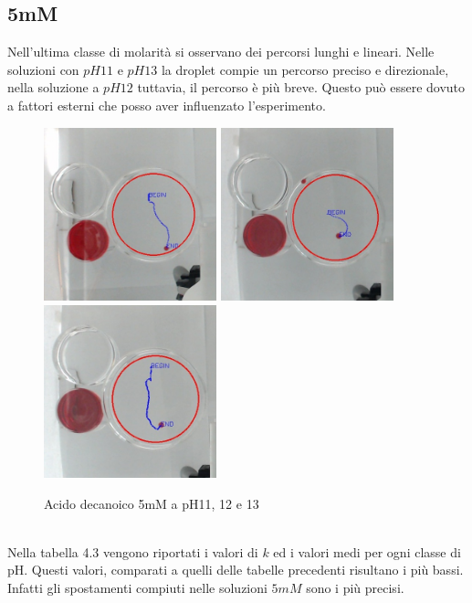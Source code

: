 \subsection{5mM}
Nell'ultima classe di molarità si osservano dei percorsi lunghi e lineari. Nelle soluzioni con $pH11$ e $pH13$ la droplet compie un percorso preciso e direzionale, nella soluzione a $pH12$ tuttavia, il percorso è più breve. Questo può essere dovuto a fattori esterni che posso aver influenzato l'esperimento.
\begin{figure}[h]
	\centering
   		{\includegraphics[width=5cm]{immagini/5mMpH11-1.jpg}} %
 	\hspace{2mm}   	
		{\includegraphics[width=5cm]{immagini/5mMpH11-2.jpg}}%
	\hspace{2mm}   	
		{\includegraphics[width=5cm]{immagini/5mMpH13-2.jpg}}%
	\caption{Acido decanoico 5mM a pH11, 12 e 13}
\end{figure}
\\Nella tabella 4.3 vengono riportati i valori di $k$ ed i valori medi per ogni classe di pH. Questi valori, comparati a quelli delle tabelle precedenti risultano i più bassi. Infatti gli spostamenti compiuti nelle soluzioni $5mM$ sono i più precisi.
